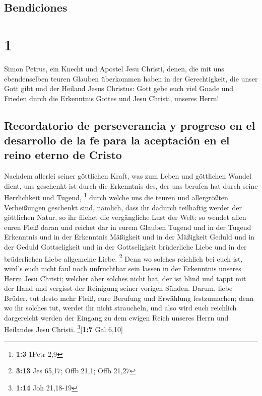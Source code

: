 \hypertarget{bendiciones}{%
\subsection{Bendiciones}\label{bendiciones}}

\hypertarget{section}{%
\section{1}\label{section}}

 Simon Petrus, ein Knecht und Apostel Jesu Christi, denen,
die mit uns ebendenselben teuren Glauben überkommen haben in der
Gerechtigkeit, die unser Gott gibt und der Heiland Jesus Christus:
 Gott gebe euch viel Gnade und Frieden durch die
Erkenntnis Gottes und Jesu Christi, unseres Herrn!

\hypertarget{recordatorio-de-perseverancia-y-progreso-en-el-desarrollo-de-la-fe-para-la-aceptaciuxf3n-en-el-reino-eterno-de-cristo}{%
\subsection{Recordatorio de perseverancia y progreso en el desarrollo de
la fe para la aceptación en el reino eterno de
Cristo}\label{recordatorio-de-perseverancia-y-progreso-en-el-desarrollo-de-la-fe-para-la-aceptaciuxf3n-en-el-reino-eterno-de-cristo}}

 Nachdem allerlei seiner göttlichen Kraft, was zum Leben
und göttlichen Wandel dient, uns geschenkt ist durch die Erkenntnis des,
der uns berufen hat durch seine Herrlichkeit und Tugend, \footnote{\textbf{1:3}
  1Petr 2,9}  durch welche uns die teuren und allergrößten
Verheißungen geschenkt sind, nämlich, dass ihr dadurch teilhaftig werdet
der göttlichen Natur, so ihr fliehet die vergängliche Lust der Welt:
 so wendet allen euren Fleiß daran und reichet dar in
eurem Glauben Tugend und in der Tugend Erkenntnis  und in
der Erkenntnis Mäßigkeit und in der Mäßigkeit Geduld und in der Geduld
Gottseligkeit  und in der Gottseligkeit brüderliche Liebe
und in der brüderlichen Liebe allgemeine Liebe. \footnote{\textbf{3:13}
  Jes 65,17; Offb 21,1; Offb 21,27}  Denn wo solches
reichlich bei euch ist, wird's euch nicht faul noch unfruchtbar sein
lassen in der Erkenntnis unseres Herrn Jesu Christi; 
welcher aber solches nicht hat, der ist blind und tappt mit der Hand und
vergisst der Reinigung seiner vorigen Sünden.  Darum,
liebe Brüder, tut desto mehr Fleiß, eure Berufung und Erwählung
festzumachen; denn wo ihr solches tut, werdet ihr nicht straucheln,
 und also wird euch reichlich dargereicht werden der
Eingang zu dem ewigen Reich unseres Herrn und Heilandes Jesu Christi.
\footnote{\textbf{1:14} Joh 21,18-19}{[}\textbf{1:7} Gal 6,10{]}

